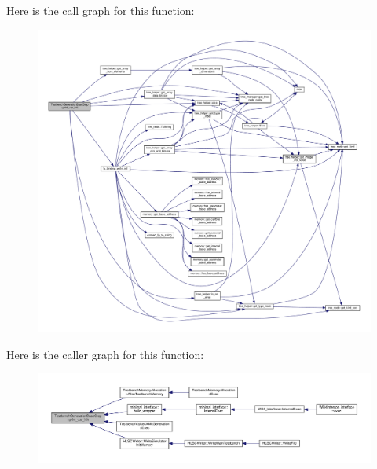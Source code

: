 Here is the call graph for this function\+:
\nopagebreak
\begin{figure}[H]
\begin{center}
\leavevmode
\includegraphics[width=350pt]{dc/d02/classTestbenchGenerationBaseStep_a65bdf2b170262882a4f5f3b07a0c9ed8_cgraph}
\end{center}
\end{figure}
Here is the caller graph for this function\+:
\nopagebreak
\begin{figure}[H]
\begin{center}
\leavevmode
\includegraphics[width=350pt]{dc/d02/classTestbenchGenerationBaseStep_a65bdf2b170262882a4f5f3b07a0c9ed8_icgraph}
\end{center}
\end{figure}
\mbox{\label{classTestbenchGenerationBaseStep_a5ce35855c2c92e267d07b648b69dbbe3}} 
